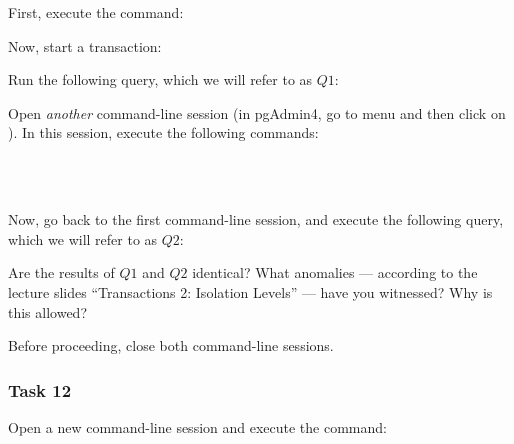 First, execute the command:

\vgap

\noindent
{}

\vgap

\noindent Now, start a transaction:

\vgap

\noindent {}

\vgap

\noindent Run the following query, which we will refer to as $Q1$:

\vgap

\noindent {}

\vgap

\noindent Open {\em another} command-line session (in pgAdmin4, go to menu  and then click on ). In this session, execute the following commands:

\vgap

\noindent {}  \\
\noindent {}  \\
\noindent {}

\vgap

\noindent Now, go back to the first command-line session, and execute the following query, which we will refer to as $Q2$:

\vgap

\noindent {}

\vgap

\noindent Are the results of $Q1$ and $Q2$ identical? What anomalies --- according to the lecture slides ``Transactions 2:
Isolation Levels'' --- have you witnessed? Why is this allowed?

\vgap

\noindent Before proceeding, close both command-line sessions.

\subsubsection{Task 12}

Open a new command-line session and execute the command:

\vgap

\noindent {}

\vgap

